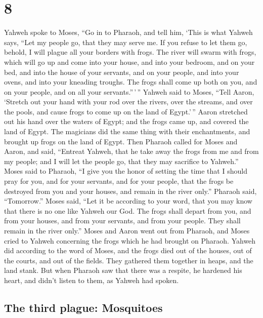 \hypertarget{section-7}{%
\section{8}\label{section-7}}

 Yahweh spoke to Moses, ``Go in to Pharaoh, and tell him,
`This is what Yahweh says, ``Let my people go, that they may serve me.
 If you refuse to let them go, behold, I will plague all
your borders with frogs.  The river will swarm with frogs,
which will go up and come into your house, and into your bedroom, and on
your bed, and into the house of your servants, and on your people, and
into your ovens, and into your kneading troughs.  The
frogs shall come up both on you, and on your people, and on all your
servants.''\,'\,''  Yahweh said to Moses, ``Tell Aaron,
`Stretch out your hand with your rod over the rivers, over the streams,
and over the pools, and cause frogs to come up on the land of
Egypt.'\,''  Aaron stretched out his hand over the waters
of Egypt; and the frogs came up, and covered the land of Egypt.
 The magicians did the same thing with their enchantments,
and brought up frogs on the land of Egypt.  Then Pharaoh
called for Moses and Aaron, and said, ``Entreat Yahweh, that he take
away the frogs from me and from my people; and I will let the people go,
that they may sacrifice to Yahweh.''  Moses said to
Pharaoh, ``I give you the honor of setting the time that I should pray
for you, and for your servants, and for your people, that the frogs be
destroyed from you and your houses, and remain in the river only.''
 Pharaoh said, ``Tomorrow.'' Moses said, ``Let it be
according to your word, that you may know that there is no one like
Yahweh our God.  The frogs shall depart from you, and
from your houses, and from your servants, and from your people. They
shall remain in the river only.''  Moses and Aaron went
out from Pharaoh, and Moses cried to Yahweh concerning the frogs which
he had brought on Pharaoh.  Yahweh did according to the
word of Moses, and the frogs died out of the houses, out of the courts,
and out of the fields.  They gathered them together in
heaps, and the land stank.  But when Pharaoh saw that
there was a respite, he hardened his heart, and didn't listen to them,
as Yahweh had spoken.

\hypertarget{the-third-plague-mosquitoes}{%
\subsection{The third plague:
Mosquitoes}\label{the-third-plague-mosquitoes}}

